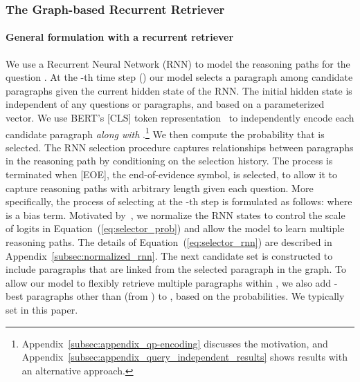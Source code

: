 \documentclass{article} \usepackage{iclr2020_conference,times}
\begin{document}
\subsubsection{The Graph-based Recurrent Retriever}
\label{sec:selector}

\vspace{-2mm}\paragraph{General formulation with a recurrent retriever}
We use a Recurrent Neural Network (RNN) to model the reasoning paths for the question .
At the -th time step () our model selects a paragraph  among candidate paragraphs  given the current hidden state  of the RNN.
The initial hidden state  is independent of any questions or paragraphs, and based on a parameterized vector.
We use BERT's [CLS] token representation~\citep{devlin2018bert} to independently encode each candidate paragraph  {\it along with} .\footnote{Appendix~\ref{subsec:appendix_qp-encoding} discusses the motivation, and Appendix~\ref{subsec:appendix_query_independent_results} shows results with an alternative approach.}
We then compute the probability  that  is selected. 
The RNN selection procedure captures relationships between paragraphs in the reasoning path by conditioning on the selection history.
The process is terminated when [EOE], the end-of-evidence symbol, is selected, to allow it to capture reasoning paths with arbitrary length given each question.  
More specifically, the process of selecting  at the -th step is formulated as follows: 
where  is a bias term.
Motivated by~\citet{NIPS2016_6114}, we normalize the RNN states to control the scale of logits in Equation~(\ref{eq:selector_prob}) and allow the model to learn multiple reasoning paths.
The details of Equation~(\ref{eq:selector_rnn}) are described in Appendix~\ref{subsec:normalized_rnn}.
The next candidate set  is constructed to include paragraphs that are linked from the selected paragraph  in the graph.
To allow our model to flexibly retrieve multiple paragraphs within , we also add -best paragraphs other than  (from ) to , based on the probabilities.
We typically set  in this paper.
\end{document}
